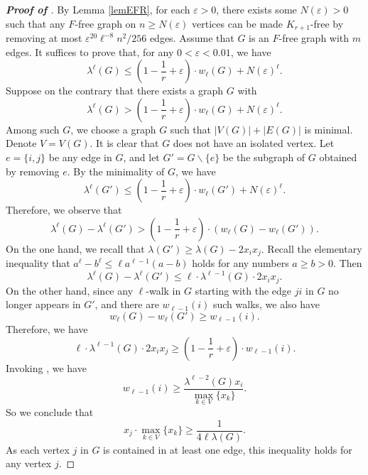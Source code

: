 \documentclass[11pt,a4paper]{article}
\theoremstyle{definition}
\theoremstyle{remark}
\begin{document}
\begin{proof}[{\bf Proof of }]
By Lemma \ref{lemEFR}, for each $\varepsilon > 0$, there exists some $N(\varepsilon) > 0$ such that any $F$-free graph on $n \geq N(\varepsilon)$ vertices can be made $K_{r+ 1}$-free by removing at most $\varepsilon^{20}\ell^{-8} n^2/256$ edges. Assume that $G$ is an $F$-free graph with $m$ edges. 
It suffices to prove that, for any $0< \varepsilon <0.01$, we have
$$\lambda^{\ell}  (G)\le 
\left(1-\frac{1}{r} + \varepsilon\right) \cdot w_{\ell}(G) + N(\varepsilon)^{\ell}.$$
Suppose  on the contrary that there exists a graph $G$ with
\begin{equation} \label{eq-contra}
\lambda^{\ell} (G) > 
\left(1-\frac{1}{r} + \varepsilon\right) \cdot w_{\ell}(G) + N(\varepsilon)^{\ell}.
\end{equation}
Among such $G$, we choose a graph $G$ such that $|V(G)| + |E(G)|$ is minimal. Denote $V = V(G)$. It is clear that $G$ does not have an isolated vertex. Let $e = \{i, j\}$ be any edge in $G$, and let $G' = G \backslash \{e\}$ be the subgraph of $G$ obtained by removing $e$. 
By the minimality of $G$, we have
$$\lambda^{\ell}(G') \leq \left(1-\frac{1}{r} + \varepsilon\right) \cdot w_{\ell}(G') + N(\varepsilon)^{\ell}.$$
Therefore, we observe that 
$$\lambda^{\ell}(G) - \lambda^{\ell}(G') > \left(1- \frac{1}{r} + \varepsilon\right) \cdot (w_{\ell}(G) - w_{\ell}(G')).$$ 
On the one hand, we recall that 
$ \lambda(G')\ge \lambda(G) - 2 x_i x_j$. Recall the elementary inequality that $a^{\ell}-b^{\ell} 
\le \ell a^{\ell -1}(a-b)$ holds for any numbers $a\ge b>0$. Then 
\[  \lambda^{\ell}(G)- \lambda^{\ell}(G') \le \ell \cdot \lambda^{\ell -1}(G) \cdot 2x_ix_j.  \]
On the other hand, since any $\ell$-walk in $G$ starting with the edge $ji$ in $G$ no longer appears in $G'$, and there are $w_{\ell - 1}(i)$ such walks, we also have
$$w_{\ell}(G) - w_{\ell}(G') \geq w_{\ell - 1}(i).$$  
Therefore, we have
$$\ell  \cdot \lambda^{\ell - 1}(G)\cdot 2x_i x_j \geq 
\left(1- \frac{1}{r} + \varepsilon\right) \cdot w_{\ell - 1}(i).$$
Invoking , we have
$$w_{\ell - 1}(i) \geq \frac{\lambda^{\ell - 2}(G) x_i}{\max_{k \in V} \{x_k\}}.$$
So we conclude that
$$x_j \cdot \max_{k \in V} \{x_k\} \geq \frac{1}{4\ell \lambda(G)}.$$
As each vertex $j$ in $G$ is contained in at least one edge, this inequality holds for any vertex $j$.


\end{proof}
\end{document}

